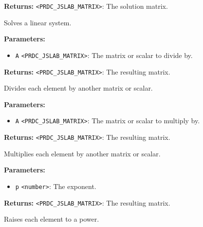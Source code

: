 \documentclass[12pt,a4paper]{article}
\begin{document}
\noindent \textbf{Returns:} \texttt{<PRDC\_JSLAB\_MATRIX>}: The solution matrix.

\noindent Solves a linear system.

\vspace{5mm}
\noindent {}


\noindent \textbf{Parameters:}
\begin{itemize}
  \item \texttt{A} \texttt{<PRDC\_JSLAB\_MATRIX>}: The matrix or scalar to divide by.
\end{itemize}

\noindent \textbf{Returns:} \texttt{<PRDC\_JSLAB\_MATRIX>}: The resulting matrix.

\noindent Divides each element by another matrix or scalar.

\vspace{5mm}
\noindent {}


\noindent \textbf{Parameters:}
\begin{itemize}
  \item \texttt{A} \texttt{<PRDC\_JSLAB\_MATRIX>}: The matrix or scalar to multiply by.
\end{itemize}

\noindent \textbf{Returns:} \texttt{<PRDC\_JSLAB\_MATRIX>}: The resulting matrix.

\noindent Multiplies each element by another matrix or scalar.

\vspace{5mm}
\noindent {}


\noindent \textbf{Parameters:}
\begin{itemize}
  \item \texttt{p} \texttt{<number>}: The exponent.
\end{itemize}

\noindent \textbf{Returns:} \texttt{<PRDC\_JSLAB\_MATRIX>}: The resulting matrix.

\noindent Raises each element to a power.

\vspace{5mm}
\noindent {}
\end{document}
